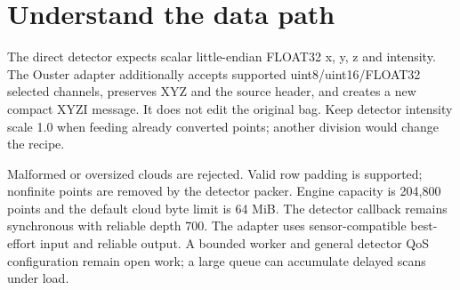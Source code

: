 \documentclass[11pt,a4paper]{article}
\begin{document}
\section{Understand the data path}
\begin{center}
\end{center}
The direct detector expects scalar little-endian FLOAT32 x, y, z and intensity.
The Ouster adapter additionally accepts supported uint8/uint16/FLOAT32 selected
channels, preserves XYZ and the source header, and creates a new compact XYZI
message. It does not edit the original bag. Keep detector intensity scale 1.0
when feeding already converted points; another division would change the recipe.

Malformed or oversized clouds are rejected. Valid row padding is supported;
nonfinite points are removed by the detector packer. Engine capacity is 204,800
points and the default cloud byte limit is 64 MiB. The detector callback remains
synchronous with reliable depth 700. The adapter uses sensor-compatible best-effort
input and reliable output. A bounded worker and general detector QoS configuration
remain open work; a large queue can accumulate delayed scans under load.
\end{document}
